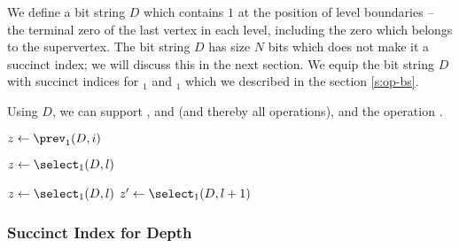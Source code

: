 We define a bit string $D$ which contains $1$ at the position of level boundaries -- the terminal zero of the last vertex in each level, including the zero which belongs to the supervertex.
The bit string $D$ has size $N$ bits which does not make it a succinct index; we will discuss this in the next section.
We equip the bit string $D$ with succinct indices for \rank$_1$ and \select$_1$ which we described in the section \ref{s:op-bs}.

Using $D$, we can support \levelRank{}, \levelSelect{} and \levelSize{} (and thereby all \levelAny{} operations), and the operation \dep{}.

\begin{algorithm}
\begin{algorithmic}
	\State $z \gets \prev_1(D, i)$ 
	\State {}
\EndFunction
\end{algorithmic}
\end{algorithm}

\begin{algorithm}
\begin{algorithmic}
	\State $z \gets \select_1(D, l)$ 
	\State {}
\EndFunction
\end{algorithmic}
\end{algorithm}

\begin{algorithm}
\begin{algorithmic}
	\State $z \gets \select_1(D, l)$ 
	\State $z' \gets \select_1(D, l + 1)$ 
	\State {}
\EndFunction
\end{algorithmic}
\end{algorithm}

\begin{algorithm}
\begin{algorithmic}
	\State {}
\EndFunction
\end{algorithmic}
\end{algorithm}

\subsubsection{Succinct Index for Depth}\label{ss:louds-depth}

